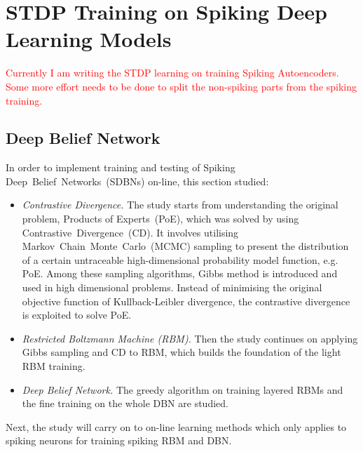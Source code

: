 \chapter{STDP Training on Spiking Deep Learning Models}
\label{cha:sdbn}

\textcolor{red}{Currently I am writing the STDP learning on training Spiking Autoencoders. Some more effort needs to be done to split the non-spiking parts from the spiking training. }

\section{Deep Belief Network}
	In order to implement training and testing of Spiking Deep~Belief~Networks~(SDBNs) on-line, this section studied:
	\begin{itemize}
		\item \textit{Contrastive Divergence.}
		The study starts from understanding the original problem, Products of Experts~(PoE), which was solved by using Contrastive~Divergence~(CD).
		It involves utilising Markov~Chain~Monte~Carlo~(MCMC) sampling to present the distribution of a certain untraceable high-dimensional probability model function, e.g. PoE.
		Among these sampling algorithms, Gibbs method is introduced and used in high dimensional problems.
		Instead of minimising the original objective function of Kullback-Leibler divergence, the contrastive divergence is exploited to solve PoE.
		\item \textit{Restricted Boltzmann Machine (RBM). }
		Then the study continues on applying Gibbs sampling and CD to RBM, which builds the foundation of the light RBM training.
		\item \textit{Deep Belief Network.} 
		The greedy algorithm on training layered RBMs and the fine training on the whole DBN are studied.
	\end{itemize}
	Next, the study will carry on to on-line learning methods which only applies to spiking neurons for training spiking RBM and DBN.
